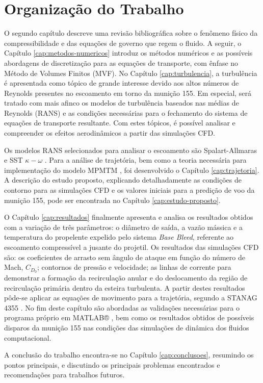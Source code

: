 \section{Organização do Trabalho}

O segundo capítulo descreve uma revisão bibliográfica sobre o fenômeno físico da compressibilidade e das equações de governo que regem o fluido. A seguir, o Capítulo \ref{cap:metodos-numericos} introduz os métodos numéricos e as possíveis abordagens de discretização para as equações de transporte, com ênfase no Método de Volumes Finitos (MVF). No Capítulo \ref{cap:turbulencia}, a turbulência é apresentada como tópico de grande interesse devido aos altos números de Reynolds presentes no escoamento em torno da munição \qty{155}{\millimetre}. Em especial, será tratado com mais afinco os modelos de turbulência baseados nas médias de Reynolds (RANS) e as condições necessárias para o fechamento do sistema de equações de transporte resultante. Com estes tópicos, é possível analisar e compreender os efeitos aerodinâmicos a partir das simulações CFD.

Os modelos RANS selecionados para analisar o escoamento são Spalart-Allmaras \cite{Spalart1992} e SST \(\kappa-\omega\) \cite{Menter1994TwoequationET,Menter2003,Menter2009}. Para a análise de trajetória, bem como a teoria necessária para implementação do modelo MPMTM \cite{stanag4355}, foi desenvolvido o Capítulo \ref{cap:trajetoria}. A descrição do estudo proposto, explicando detalhadamente as condições de contorno para as simulações CFD e os valores iniciais para a predição de voo da munição \qty{155}{\millimetre}, pode ser encontrada no Capítulo \ref{cap:estudo-proposto}.

O Capítulo \ref{cap:resultados} finalmente apresenta e analisa os resultados obtidos com a variação de três parâmetros: o diâmetro de saída, a vazão mássica e a temperatura do propelente expelido pelo sistema \textit{Base Bleed}, referente ao escoamento compressível a jusante do projetil. Os resultados das simulações CFD são: os coeficientes de arrasto sem ângulo de ataque em função do número de Mach, \(C_{D_{0}}\); contornos de pressão e velocidade; as linhas de corrente para demonstrar a formação da recirculação anular e do deslocamento da região de recirculação primária dentro da esteira turbulenta. A partir destes resultados pôde-se aplicar as equações de movimento para a trajetória, segundo a STANAG 4355 \cite{stanag4355}. No fim deste capítulo são abordadas as validações necessárias para o programa próprio em MATLAB® \cite{ThallyoENCIT2022,Thallyo2022}, bem como os resultados obtidos de possíveis disparos da munição \qty{155}{\millimetre} nas condições das simulações de dinâmica dos fluidos computacional. 

A conclusão do trabalho encontra-se no Capítulo \ref{cap:conclusoes}, resumindo os pontos principais, e discutindo os principais problemas encontrados e recomendações para trabalhos futuros.